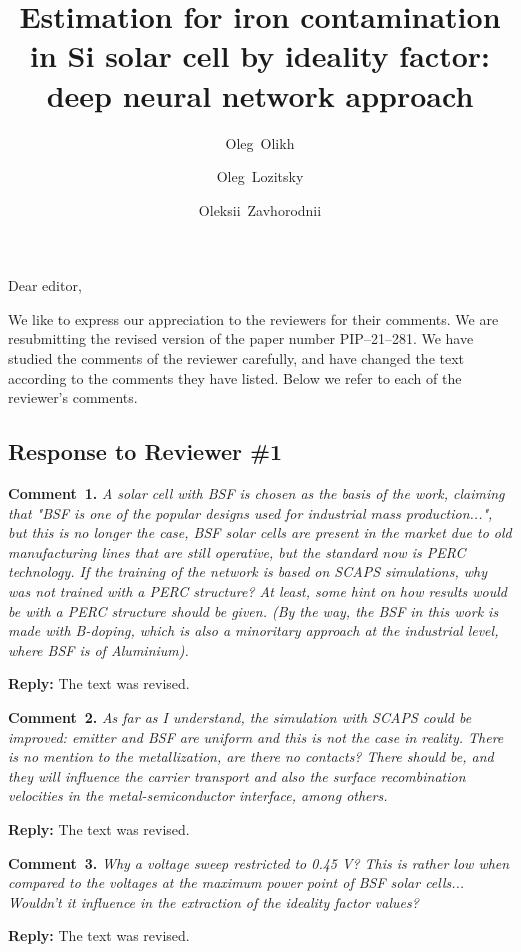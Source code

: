 \documentclass[num-refs]{wiley-article} %
\title{Estimation for iron contamination in Si solar cell by ideality factor: deep neural network approach}
\author[1]{Oleg~Olikh}
\author[1]{Oleg~Lozitsky}
\author[1]{Oleksii~Zavhorodnii}
\affil[1]{Taras Shevchenko National University of Kyiv, 64/13, Volodymyrska Street, Kyiv, 01601, Ukraine}
\begin{document}
Dear editor,

We like to express our appreciation to the reviewers for their comments.
We are resubmitting the revised version of the paper number PIP--21--281.
We have studied the comments of the reviewer carefully, and have changed the text according to the comments they
have listed.
Below we refer to each of the reviewer’s comments.

\subsection*{Response to Reviewer \#1 }

\noindent
\textcolor[rgb]{0.00,0.50,1.00}{\textbf{Comment~1.}}
\emph{A solar cell with BSF is chosen as the basis of the work, claiming that 
"BSF is one of the popular designs used for industrial mass production...", 
but this is no longer the case, BSF solar cells are present in the market due to old manufacturing lines that are still operative, but the standard now is PERC technology. 
If the training of the network is based on SCAPS simulations, why was not trained with a PERC structure? 
At least, some hint on how results would be with a PERC structure should be given. 
(By the way, the BSF in this work is made with B-doping, which is also a minoritary approach at the industrial level, where BSF is of Aluminium).}


\noindent
\textcolor[rgb]{0.51,0.00,0.00}{\textbf{Reply:}}
The text was revised.


\textcolor[rgb]{0.00,0.50,1.00}{\textbf{Comment~2.}}
\emph{As far as I understand, the simulation with SCAPS could be improved: emitter and BSF are uniform and this is not the case in reality. 
There is no mention to the metallization, are there no contacts? 
There should be, and they will influence the carrier transport and also the surface recombination velocities in the metal-semiconductor interface, among others.}


\noindent
\textcolor[rgb]{0.51,0.00,0.00}{\textbf{Reply:}}
The text was revised.

\textcolor[rgb]{0.00,0.50,1.00}{\textbf{Comment~3.}}
\emph{Why a voltage sweep restricted to 0.45 V?
This is rather low when compared to the voltages at the maximum power point of BSF solar cells...
Wouldn't it influence in the extraction of the ideality factor values?}

\noindent
\textcolor[rgb]{0.51,0.00,0.00}{\textbf{Reply:}}
The text was revised.
\end{document}
